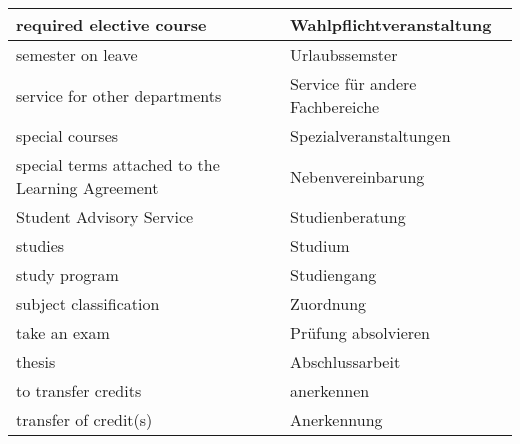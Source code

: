 \begin{longtable} {|p{.5\linewidth}|p{.5\linewidth}|}
    \hline
    required elective course                                       & Wahlpflichtveranstaltung            \\
    \hline
    semester on leave                                              & Urlaubssemster                      \\
    \hline
    service for other departments                                  & Service für andere Fachbereiche     \\
    \hline
    special courses                                                & Spezialveranstaltungen              \\
    \hline
    special terms attached to the Learning Agreement               & Nebenvereinbarung                   \\
    \hline
    Student Advisory Service                                       & Studienberatung                     \\
    \hline
    studies                                                        & Studium                             \\
    \hline
    study program                                                  & Studiengang                         \\
    \hline
    subject classification                                         & Zuordnung                           \\
    \hline
    take an exam                                                   & Prüfung absolvieren                 \\
    \hline
    thesis                                                         & Abschlussarbeit                     \\
    \hline
    to transfer credits                                            & anerkennen                          \\
    \hline
    transfer of credit(s)                                          & Anerkennung                         \\
    \hline
\end{longtable}

